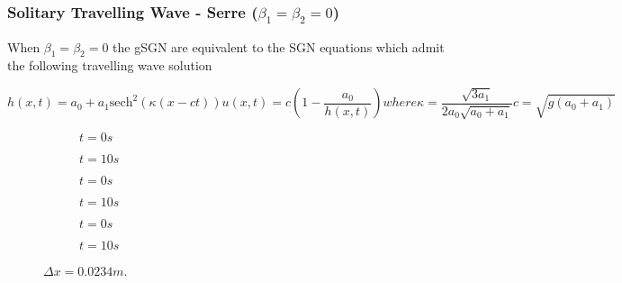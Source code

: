 \documentclass[10pt]{article}
\begin{document}
\subsubsection{Solitary Travelling Wave - Serre ($\beta_1=\beta_2 =0$) }
When $\beta_1 = \beta_2 = 0$ the gSGN are equivalent to the SGN equations which admit the following travelling wave solution

\begin{subequations}
	\begin{equation}
	h(x,t) = a_0 + a_1 \text{sech}^2\left( \kappa (x - ct) \right)
	\end{equation}
	\begin{equation}
	u(x,t) = c \left( 1- \dfrac{a_0}{h(x,t)} \right)
	\end{equation}
	where
	\begin{equation}
	\kappa = \dfrac{\sqrt{3a_1}}{2a_0 \sqrt{a_0 + a_1}}
	\end{equation}
	\begin{equation}
	c = \sqrt{g\left(a_0 + a_1\right)}
	\end{equation}
\end{subequations}

\begin{figure}
	\centering
	\begin{subfigure}{0.49\textwidth}
	\centering
	
	\caption{$t = 0s$}
	\end{subfigure}
	\begin{subfigure}{0.49\textwidth}
	\centering
	
	\caption{$t = 10s$}
	\end{subfigure}
	\begin{subfigure}{0.49\textwidth}
	\centering
	
	\caption{$t = 0s$}
\end{subfigure}
\begin{subfigure}{0.49\textwidth}
	\centering
	
	\caption{$t = 10s$}
\end{subfigure}
	\begin{subfigure}{0.49\textwidth}
	\centering
	
	\caption{$t = 0s$}
\end{subfigure}
\begin{subfigure}{0.49\textwidth}
	\centering
	
	\caption{$t = 10s$}
\end{subfigure}
	\caption{$\Delta x = 0.0234 m$. }
\end{figure}
\end{document}
